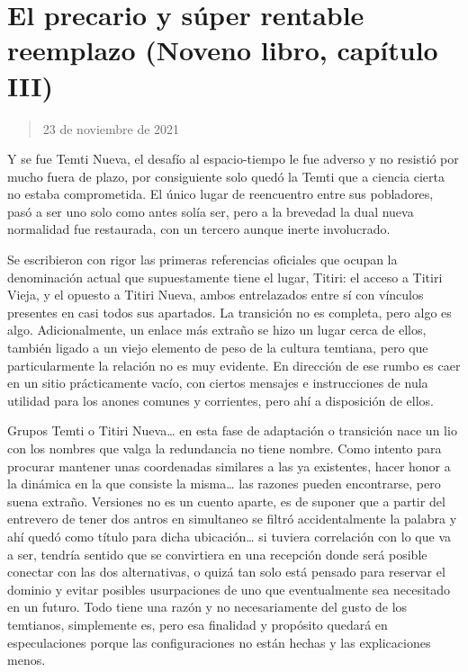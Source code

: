 \documentclass[
  spanish,
]{book}
\begin{document}
\hypertarget{el-precario-y-suxfaper-rentable-reemplazo-noveno-libro-capuxedtulo-iii}{%
\section{El precario y súper rentable reemplazo (Noveno libro, capítulo III)}\label{el-precario-y-suxfaper-rentable-reemplazo-noveno-libro-capuxedtulo-iii}}

\begin{quote}
23 de noviembre de 2021
\end{quote}

Y se fue Temti Nueva, el desafío al espacio-tiempo le fue adverso y no resistió por mucho fuera de plazo, por consiguiente solo quedó la Temti que a ciencia cierta no estaba comprometida. El único lugar de reencuentro entre sus pobladores, pasó a ser uno solo como antes solía ser, pero a la brevedad la dual nueva normalidad fue restaurada, con un tercero aunque inerte involucrado.

Se escribieron con rigor las primeras referencias oficiales que ocupan la denominación actual que supuestamente tiene el lugar, Titiri: el acceso a Titiri Vieja, y el opuesto a Titiri Nueva, ambos entrelazados entre sí con vínculos presentes en casi todos sus apartados. La transición no es completa, pero algo es algo. Adicionalmente, un enlace más extraño se hizo un lugar cerca de ellos, también ligado a un viejo elemento de peso de la cultura temtiana, pero que particularmente la relación no es muy evidente. En dirección de ese rumbo es caer en un sitio prácticamente vacío, con ciertos mensajes e instrucciones de nula utilidad para los anones comunes y corrientes, pero ahí a disposición de ellos.

Grupos Temti o Titiri Nueva\ldots{} en esta fase de adaptación o transición nace un lio con los nombres que valga la redundancia no tiene nombre. Como intento para procurar mantener unas coordenadas similares a las ya existentes, hacer honor a la dinámica en la que consiste la misma\ldots{} las razones pueden encontrarse, pero suena extraño. Versiones no es un cuento aparte, es de suponer que a partir del entrevero de tener dos antros en simultaneo se filtró accidentalmente la palabra y ahí quedó como título para dicha ubicación\ldots{} si tuviera correlación con lo que va a ser, tendría sentido que se convirtiera en una recepción donde será posible conectar con las dos alternativas, o quizá tan solo está pensado para reservar el dominio y evitar posibles usurpaciones de uno que eventualmente sea necesitado en un futuro. Todo tiene una razón y no necesariamente del gusto de los temtianos, simplemente es, pero esa finalidad y propósito quedará en especulaciones porque las configuraciones no están hechas y las explicaciones menos.
\end{document}
